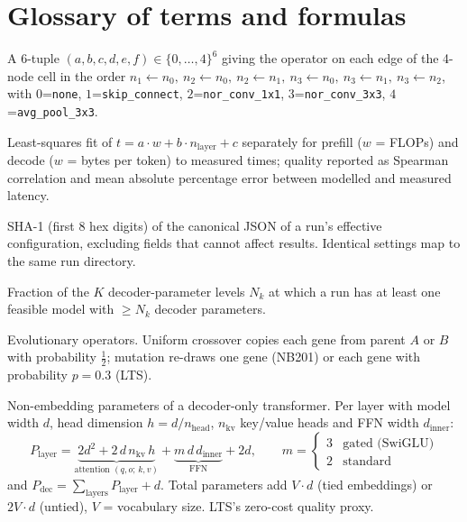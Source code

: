 \documentclass[11pt,a4paper]{article}
\newcommand{\code}[1]{\texttt{#1}}
\begin{document}
\appendix
\section{Glossary of terms and formulas}\label{sec:glossary}
\begin{description}[style=nextline,leftmargin=0pt,itemsep=3pt]

\item[Architecture code (NB201).] A 6-tuple $(a,b,c,d,e,f)\in\{0,\dots,4\}^6$ giving the operator on each edge of the 4-node cell in the order $n_1{\leftarrow}n_0,\ n_2{\leftarrow}n_0,\ n_2{\leftarrow}n_1,\ n_3{\leftarrow}n_0,\ n_3{\leftarrow}n_1,\ n_3{\leftarrow}n_2$, with $0$=\code{none}, $1$=\code{skip\_connect}, $2$=\code{nor\_conv\_1x1}, $3$=\code{nor\_conv\_3x3}, $4$=\code{avg\_pool\_3x3}.

\item[Calibration (cost model).] Least-squares fit of $t = a\cdot w + b\cdot n_{\text{layer}} + c$ separately for prefill ($w$ = FLOPs) and decode ($w$ = bytes per token) to measured times; quality reported as Spearman correlation and mean absolute percentage error between modelled and measured latency.

\item[Configuration hash.] SHA-1 (first 8 hex digits) of the canonical JSON of a run's effective configuration, excluding fields that cannot affect results. Identical settings map to the same run directory.

\item[Coverage.] Fraction of the $K$ decoder-parameter levels $N_k$ at which a run has at least one feasible model with $\ge N_k$ decoder parameters.

\item[Crossover / mutation.] Evolutionary operators. Uniform crossover copies each gene from parent $A$ or $B$ with probability $\tfrac12$; mutation re-draws one gene (NB201) or each gene with probability $p=0.3$ (LTS).

\item[Decoder parameters.] Non-embedding parameters of a decoder-only transformer. Per layer with model width $d$, head dimension $h=d/n_{\text{head}}$, $n_{\text{kv}}$ key/value heads and FFN width $d_{\text{inner}}$:
\[
P_{\text{layer}} = \underbrace{2d^2 + 2\,d\,n_{\text{kv}}\,h}_{\text{attention }(q,o;\,k,v)} + \underbrace{m\,d\,d_{\text{inner}}}_{\text{FFN}} + 2d,\qquad m=\begin{cases}3 & \text{gated (SwiGLU)}\\ 2 & \text{standard}\end{cases}
\]
and $P_{\text{dec}}=\sum_{\text{layers}}P_{\text{layer}}+d$. Total parameters add $V\!\cdot\! d$ (tied embeddings) or $2V\!\cdot\! d$ (untied), $V$ = vocabulary size. LTS's zero-cost quality proxy.


\end{description}
\end{document}

